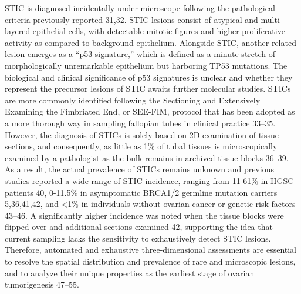 \begin{refsection}
    STIC is diagnosed incidentally under microscope following the pathological criteria previously reported\cite{Vang2012Validation,Negri2024Diagnosis} 31,32. STIC lesions consist of atypical and multi-layered epithelial cells, with detectable mitotic figures and higher proliferative activity as compared to background epithelium. Alongside STIC, another related lesion emerges as a “p53 signature,” which is defined as a minute stretch of morphologically unremarkable epithelium but harboring TP53 mutations. The biological and clinical significance of p53 signatures is unclear and whether they represent the precursor lesions of STIC awaits further molecular studies. STICs are more commonly identified following the Sectioning and Extensively Examining the Fimbriated End, or SEE-FIM, protocol that has been adopted as a more thorough way in sampling fallopian tubes in clinical practice\cite{Medeiros2006tubal,Lamb2006Predictors,Mahe2013Do} 33–35. However, the diagnosis of STICs is solely based on 2D examination of tissue sections, and consequently, as little as 1\% of tubal tissues is microscopically examined by a pathologist as the bulk remains in archived tissue blocks\cite{Bogaerts2022Recommendations,Vang2013Fallopian,Akahane2022TP53,KiemenPanIN} 36–39. As a result, the actual prevalence of STICs remains unknown and previous studies reported a wide range of STIC incidence, ranging from 11-61\% in HGSC patients\cite{Chen2017Serous} 40, 0-11.5\% in asymptomatic BRCA1/2 germline mutation carriers\cite{Kim2018Cell,Bogaerts2022Recommendations,Wethington2013Clinical,Visvanathan2018Fallopian} 5,36,41,42, and <1\% in individuals without ovarian cancer or genetic risk factors\cite{Meserve2017Frequency,Samimi2018Population,Morrison2015Incidental} 43–46.  A significantly higher incidence was noted when the tissue blocks were flipped over and additional sections examined\cite{Visvanathan2018Fallopian} 42, supporting the idea that current sampling lacks the sensitivity to exhaustively detect STIC lesions. Therefore, automated and exhaustive three-dimensional assessments are essential to resolve the spatial distribution and prevalence of rare and microscopic lesions, and to analyze their unique properties as the earliest stage of ovarian tumorigenesis\cite{Forjaz2025Three,Liu2023Engineering,Song2024Analysis,Lin2023Multiplexed,Serafin2023Nondestructive,Crawford2024Combined,Vaughan2011Rethinking,Kiemen2022CODA,Kiemen20243D} 47–55.

\end{refsection}
